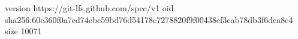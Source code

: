 version https://git-lfs.github.com/spec/v1
oid sha256:60e360f0a7ed74ebc59bd76d54178c7278820f9f00438cf3cab78db3f6dca8c4
size 10071
